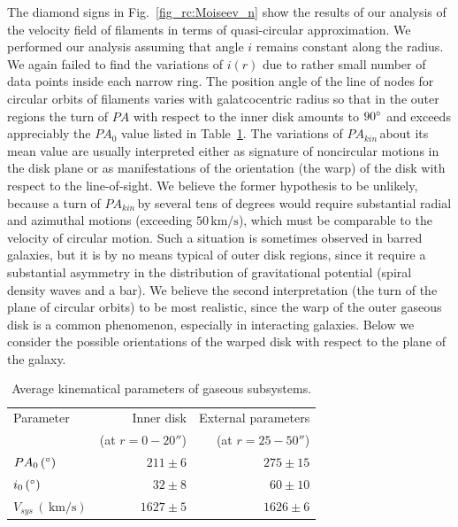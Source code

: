 \documentclass{ab}
\def\degr{\hbox{$^\circ$}}
\newcommand{\km}{\,\mbox{km/s}}
\def\pak{$PA_{kin}$\,}
\begin{document}
The diamond signs in Fig.~\ref{fig_rc:Moiseev_n} show the results
of our analysis of the velocity field of filaments in  terms of
quasi-circular approximation. We performed our analysis assuming
that angle $i$ remains constant along the radius. We again failed
to find the variations of $i(r)$ due to rather small number of
data points inside each narrow ring. The position angle of the
line of nodes for circular orbits of filaments varies with
galatcocentric radius so that in the outer regions the turn of
$PA$ with respect to the inner disk amounts to  $90\degr$ and
exceeds appreciably the $PA_0$ value listed in
Table~\ref{tab:Moiseev_n}. The variations of \pak about its mean
value are usually interpreted either as signature of noncircular
motions in the disk plane or as manifestations of the orientation
(the warp) of the disk with respect to the line-of-sight. We
believe the former hypothesis to be unlikely, because a turn of
\pak by several tens of degrees would require substantial radial
and azimuthal motions (exceeding $50\km$), which must be
comparable to the velocity of circular motion. Such a situation is
sometimes observed in barred galaxies, but it is by no means
typical of outer disk regions, since it require a substantial
asymmetry in the distribution of gravitational potential (spiral
density waves and a bar). We believe the second interpretation
(the turn of the plane of circular orbits) to be most realistic,
since the warp of the outer gaseous disk is a common phenomenon,
especially in interacting galaxies. Below we consider the possible
orientations of the warped disk with respect to the plane of the
galaxy.



\begin{table}[tbp]
\caption{Average kinematical parameters of gaseous subsystems.} \label{tab:Moiseev_n}\bigskip
\begin{tabular}{lrr}\hline\hline
Parameter& Inner disk &  External parameters\\
         & (at $r=0-20''$) & (at $r=25-50''$) \\
\hline
$PA_0\,(\degr)$ & $211\pm6$ & $275\pm15$\\
$i_0\,(\degr)$ & $32\pm8$ & $60\pm10$\\
$V_{sys}\,(\km)$ & $1627\pm5$ &  $1626\pm6$\\
\hline
\end{tabular}
\end{table}
\end{document}
